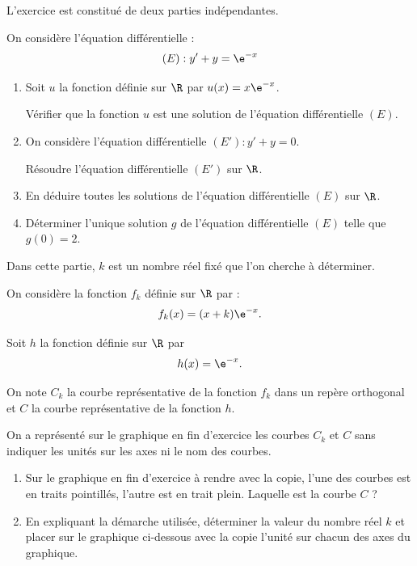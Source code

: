 L'exercice est constitué de deux parties indépendantes.

\medskip


\medskip

On considère l'équation différentielle :
\[(E): y' + y = \e^{-x}\]

\begin{enumerate}
\item Soit $u$ la fonction définie sur $\R$ par $u(x) = x \e^{-x}$.

Vérifier que la fonction $u$ est une solution de l'équation différentielle $(E)$.
\item On considère l'équation différentielle $\left(E'\right): y' + y = 0$.

Résoudre l'équation différentielle $\left(E'\right)$ sur $\R$.

\item En déduire toutes les solutions de l'équation différentielle $(E)$ sur $\R$.

\item Déterminer l'unique solution $g$ de l'équation différentielle $(E)$ telle que $g(0) = 2$.
\end{enumerate}


\medskip


\medskip

Dans cette partie, $k$ est un nombre réel fixé que l'on cherche à déterminer.

On considère la fonction $f_{k}$ définie sur $\R$ par :
\[f_{k}(x) = (x + k) \e^{-x}.\]

Soit $h$ la fonction définie sur $\R$ par
\[h(x) = \e^{-x}.\]

On note $C_{k}$ la courbe représentative de la fonction $f_{k}$ dans un repère orthogonal et $C$ la courbe représentative de la fonction $h$.

On a représenté sur le graphique en fin d'exercice les courbes $C_{k}$ et $C$ sans indiquer les unités sur les axes ni le nom des courbes.

	\begin{enumerate}
		\item Sur le graphique en fin d'exercice à rendre avec la copie, l'une des courbes est en traits pointillés, l'autre est en trait plein. Laquelle est la courbe $C$ ?

		\item En expliquant la démarche utilisée, déterminer la valeur du nombre réel $k$ et placer sur le graphique ci-dessous avec la copie l'unité sur chacun des axes du graphique.
	\end{enumerate}

